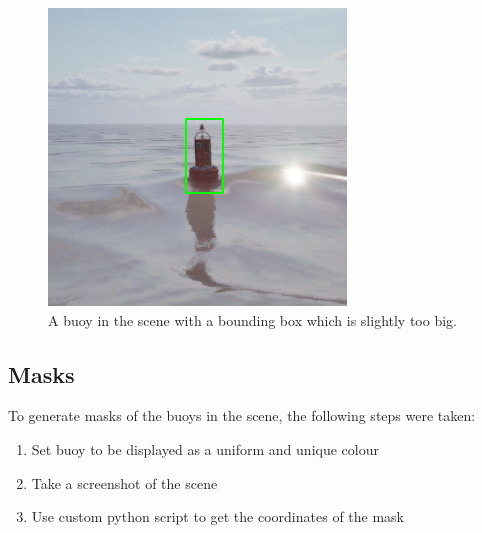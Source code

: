 \documentclass[10pt,twocolumn,letterpaper]{article}
\begin{document}
\begin{figure}[t]
    \centering
    \includegraphics[width=\linewidth]{images/buoy_with_bounding_box.png}
    \caption{A buoy in the scene with a bounding box which is slightly too big.}
    \label{fig:buoy_with_bounding_box}
\end{figure}

\subsection{Masks}

To generate masks of the buoys in the scene, the following steps were taken:

\begin{enumerate}
    \item Set buoy to be displayed as a uniform and unique colour
    \item Take a screenshot of the scene
    \item Use custom python script to get the coordinates of the mask
\end{enumerate}
\end{document}
